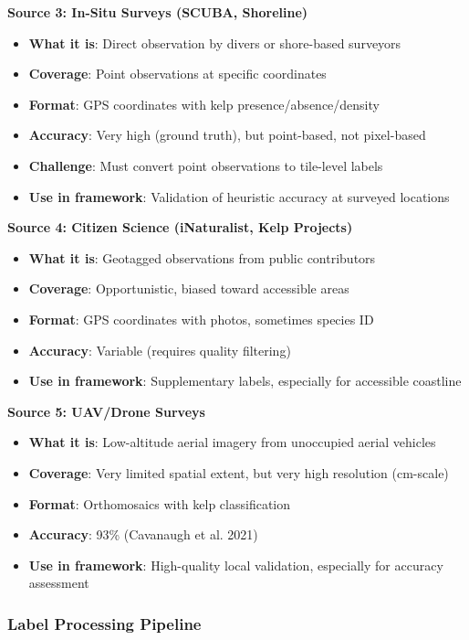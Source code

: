 \documentclass[11pt]{article}
\begin{document}
\textbf{Source 3: In-Situ Surveys (SCUBA, Shoreline)}
\begin{itemize}
    \item \textbf{What it is}: Direct observation by divers or shore-based surveyors
    \item \textbf{Coverage}: Point observations at specific coordinates
    \item \textbf{Format}: GPS coordinates with kelp presence/absence/density
    \item \textbf{Accuracy}: Very high (ground truth), but point-based, not pixel-based
    \item \textbf{Challenge}: Must convert point observations to tile-level labels
    \item \textbf{Use in framework}: Validation of heuristic accuracy at surveyed locations
\end{itemize}

\textbf{Source 4: Citizen Science (iNaturalist, Kelp Projects)}
\begin{itemize}
    \item \textbf{What it is}: Geotagged observations from public contributors
    \item \textbf{Coverage}: Opportunistic, biased toward accessible areas
    \item \textbf{Format}: GPS coordinates with photos, sometimes species ID
    \item \textbf{Accuracy}: Variable (requires quality filtering)
    \item \textbf{Use in framework}: Supplementary labels, especially for accessible coastline
\end{itemize}

\textbf{Source 5: UAV/Drone Surveys}
\begin{itemize}
    \item \textbf{What it is}: Low-altitude aerial imagery from unoccupied aerial vehicles
    \item \textbf{Coverage}: Very limited spatial extent, but very high resolution (cm-scale)
    \item \textbf{Format}: Orthomosaics with kelp classification
    \item \textbf{Accuracy}: 93\% (Cavanaugh et al. 2021)
    \item \textbf{Use in framework}: High-quality local validation, especially for accuracy assessment
\end{itemize}

\subsubsection{Label Processing Pipeline}
\end{document}
